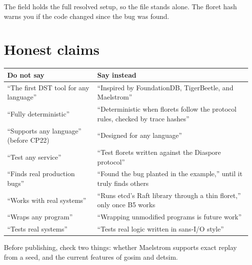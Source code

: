 \documentclass[11pt,letterpaper]{article}
\newcommand{\code}[1]{\texttt{\detokenize{#1}}}
\begin{document}
The \code{config} field holds the full resolved setup, so the file stands alone. The floret hash warns you if the code changed since the bug was found.

\section{Honest claims}
\label{app:claims}

\begin{center}
\small
\renewcommand{\arraystretch}{1.4}
\begin{tabularx}{\linewidth}{@{}X X@{}}
\toprule
\textbf{Do not say} & \textbf{Say instead} \\
\midrule
``The first DST tool for any language'' & ``Inspired by FoundationDB, TigerBeetle, and Maelstrom'' \\
``Fully deterministic'' & ``Deterministic when florets follow the protocol rules, checked by trace hashes'' \\
``Supports any language'' (before CP22) & ``Designed for any language'' \\
``Test any service'' & ``Test florets written against the Diaspore protocol'' \\
``Finds real production bugs'' & ``Found the bug planted in the example,'' until it truly finds others \\
``Works with real systems'' & ``Runs etcd's Raft library through a thin floret,'' only once B5 works \\
``Wraps any program'' & ``Wrapping unmodified programs is future work'' \\
``Tests real systems'' & ``Tests real logic written in sans-I/O style'' \\
\bottomrule
\end{tabularx}
\end{center}

Before publishing, check two things: whether Maelstrom supports exact replay from a seed, and the current features of gosim and detsim.
\end{document}
